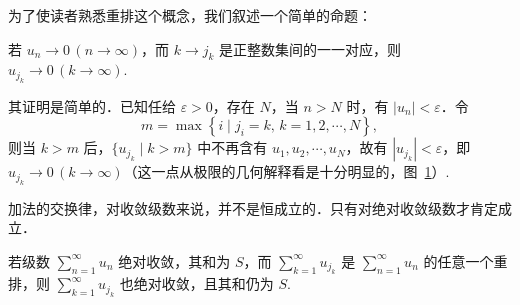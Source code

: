 为了使读者熟悉重排这个概念，我们叙述一个简单的命题：
\begin{proposition*}
若 $u_{n}\to0\,(n\to\infty)$，而 $k\to j_{k}$ 是正整数集间的一一对应，则 $u_{j_{k}}\to0\,(k\to\infty)$.
\end{proposition*}
其证明是简单的．已知任给 $\varepsilon>0$，存在 $N$，当 $n>N$ 时，有 $\left|u_{n}\right|<\varepsilon$．令
\[
m=\max\left\{i\mid j_{i}=k,\,k=1,2,\cdots,N\right\},
\]
则当 $k>m$ 后，$\{u_{j_{k}}\mid k>m\}$ 中不再含有 $u_{1},u_{2},\cdots,u_{N}$，故有 $\left|u_{j_{k}}\right|<\varepsilon$，即 $u_{j_{k}}\to0\,(k\to\infty)$（这一点从极限的几何解释看是十分明显的，图~\ref{fig:10-3}）.

\begin{figure}[htbp]
\centering
{}
\caption{\relax}
\label{fig:10-3}
\end{figure}

加法的交换律，对收敛级数来说，并不是恒成立的．只有对绝对收敛级数才肯定成立．

\begin{theorem}\label{thm:10-20}
若级数 $\displaystyle\sum_{n=1}^{\infty}u_{n}$ 绝对收敛，其和为 $S$，而 $\sum_{k=1}^{\infty}u_{j_{k}}$ 是 $\sum_{n=1}^{\infty}u_{n}$ 的任意一个重排，则 $\sum_{k=1}^{\infty}u_{j_{k}}$ 也绝对收敛，且其和仍为 $S$.
\end{theorem}

